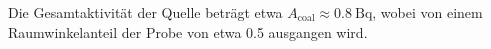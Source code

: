 Die Gesamtaktivität der Quelle beträgt etwa $A_\text{coal} \approx \SI{0.8}{\becquerel}$,
wobei von einem Raumwinkelanteil der Probe von etwa \num{0.5} ausgangen wird.
